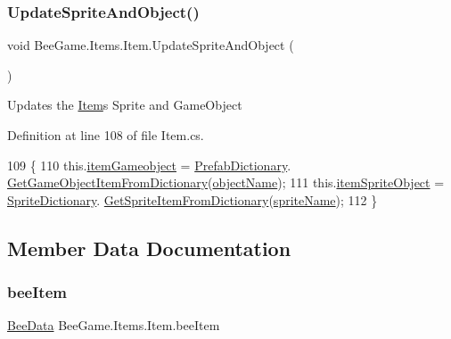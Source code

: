 \subsubsection{\texorpdfstring{Update\+Sprite\+And\+Object()}{UpdateSpriteAndObject()}}
{\footnotesize\ttfamily void Bee\+Game.\+Items.\+Item.\+Update\+Sprite\+And\+Object (\begin{DoxyParamCaption}{ }\end{DoxyParamCaption})}



Updates the \hyperlink{struct_bee_game_1_1_items_1_1_item}{Item}\textquotesingle{}s Sprite and Game\+Object 



Definition at line 108 of file Item.\+cs.


\begin{DoxyCode}
109         \{
110             this.\hyperlink{struct_bee_game_1_1_items_1_1_item_af28a8cd4a0eff9d4c18189c5ab525f18}{itemGameobject} = \hyperlink{class_bee_game_1_1_core_1_1_prefab_dictionary}{PrefabDictionary}.
      \hyperlink{class_bee_game_1_1_core_1_1_prefab_dictionary_a5435ea289663e612fc964438691e32d0}{GetGameObjectItemFromDictionary}(\hyperlink{struct_bee_game_1_1_items_1_1_item_ade55c08e49c1c4017c91978119876387}{objectName});
111             this.\hyperlink{struct_bee_game_1_1_items_1_1_item_abd1dd5d605d0768bce6402f64f5cb699}{itemSpriteObject} = \hyperlink{class_bee_game_1_1_core_1_1_sprite_dictionary}{SpriteDictionary}.
      \hyperlink{class_bee_game_1_1_core_1_1_sprite_dictionary_a17fca1828cb89197a540e2e7ab0c43cd}{GetSpriteItemFromDictionary}(\hyperlink{struct_bee_game_1_1_items_1_1_item_a268ba3cca2e9fa79fb5aff3c880f6505}{spriteName});
112         \}
\end{DoxyCode}


\subsection{Member Data Documentation}
\mbox{\label{struct_bee_game_1_1_items_1_1_item_a0593f3b7b3ff5daa864f3c6d0ccd77ca}} 
\subsubsection{\texorpdfstring{bee\+Item}{beeItem}}
{\footnotesize\ttfamily \hyperlink{struct_bee_game_1_1_bee_1_1_bee_data}{Bee\+Data} Bee\+Game.\+Items.\+Item.\+bee\+Item}



